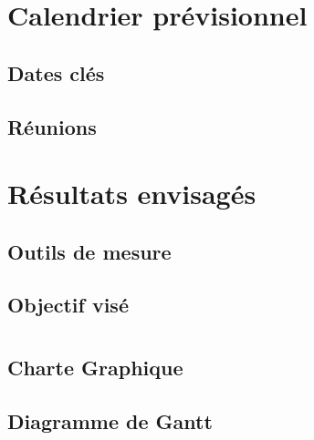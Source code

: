 \documentclass{report}
\begin{document}
\chapter{Calendrier prévisionnel}
\section{Dates clés}
\section{Réunions}

\chapter{Résultats envisagés}
\section{Outils de mesure}
\section{Objectif visé}

\newpage
\appendix
\chapter{}
\section{Charte Graphique}
\section{Diagramme de Gantt}
\end{document}
